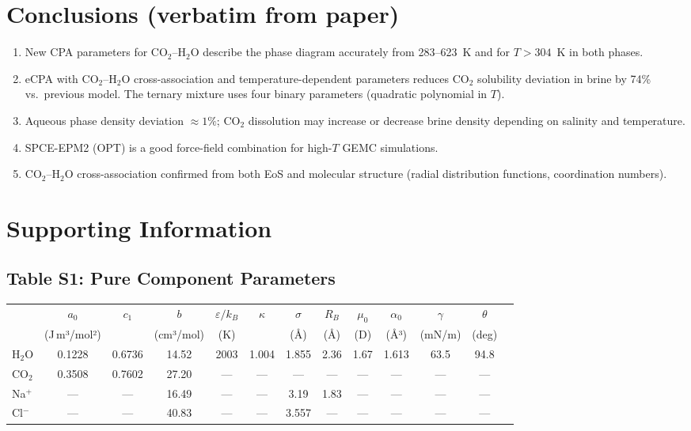 \documentclass[11pt]{article}
\begin{document}
\section{Conclusions (verbatim from paper)}

\begin{enumerate}
  \item New CPA parameters for CO$_2$--H$_2$O describe the phase diagram accurately from
    283--623~K and for $T > 304$~K in both phases.
  \item eCPA with CO$_2$--H$_2$O cross-association and temperature-dependent parameters
    reduces CO$_2$ solubility deviation in brine by 74\% vs.\ previous model.
    The ternary mixture uses four binary parameters (quadratic polynomial in $T$).
  \item Aqueous phase density deviation $\approx 1\%$; CO$_2$ dissolution may increase
    or decrease brine density depending on salinity and temperature.
  \item SPCE-EPM2 (OPT) is a good force-field combination for high-$T$ GEMC simulations.
  \item CO$_2$--H$_2$O cross-association confirmed from both EoS and molecular structure
    (radial distribution functions, coordination numbers).
\end{enumerate}

\section{Supporting Information}

\subsection*{Table S1: Pure Component Parameters}

\begin{center}
\begin{tabular}{lcccccccccccc}
\hline
 & $a_0$ & $c_1$ & $b$ & $\varepsilon/k_B$ & $\kappa$ & $\sigma$ & $R_B$ & $\mu_0$ & $\alpha_0$ & $\gamma$ & $\theta$ \\
 & (J\,m³/mol²) & & (cm³/mol) & (K) & & (Å) & (Å) & (D) & (Å³) & (mN/m) & (deg) \\
\hline
H$_2$O & 0.1228 & 0.6736 & 14.52 & 2003 & 1.004 & 1.855 & 2.36 & 1.67 & 1.613 & 63.5 & 94.8 \\
CO$_2$ & 0.3508 & 0.7602 & 27.20 & --- & --- & --- & --- & --- & --- & --- & --- \\
Na$^+$ & --- & --- & 16.49 & --- & --- & 3.19 & 1.83 & --- & --- & --- & --- \\
Cl$^-$ & --- & --- & 40.83 & --- & --- & 3.557 & --- & --- & --- & --- & --- \\
\hline
\end{tabular}
\end{center}
\end{document}
